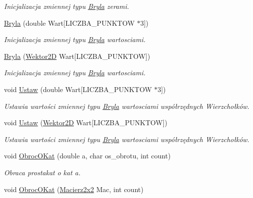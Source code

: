 \begin{DoxyCompactItemize}
\begin{DoxyCompactList}\small\item\em Inicjalizacja zmiennej typu \hyperlink{class_bryla}{Bryla} zerami. \end{DoxyCompactList}\item 
\hyperlink{class_bryla_afb7a04c4b622d9db9119d1a69bc9985b}{Bryla} (double Wart\mbox{[}L\+I\+C\+Z\+B\+A\+\_\+\+P\+U\+N\+K\+T\+O\+W $\ast$3\mbox{]})
\begin{DoxyCompactList}\small\item\em Inicjalizacja zmiennej typu \hyperlink{class_bryla}{Bryla} wartosciami. \end{DoxyCompactList}\item 
\hyperlink{class_bryla_ae2b6090579433d6c3105b757cd77a7df}{Bryla} (\hyperlink{class_wektor2_d}{Wektor2\+D} Wart\mbox{[}L\+I\+C\+Z\+B\+A\+\_\+\+P\+U\+N\+K\+T\+O\+W\mbox{]})
\begin{DoxyCompactList}\small\item\em Inicjalizacja zmiennej typu \hyperlink{class_bryla}{Bryla} wartosciami. \end{DoxyCompactList}\item 
void \hyperlink{class_bryla_a393c921d51e8d970f199c2ae509d8436}{Ustaw} (double Wart\mbox{[}L\+I\+C\+Z\+B\+A\+\_\+\+P\+U\+N\+K\+T\+O\+W $\ast$3\mbox{]})
\begin{DoxyCompactList}\small\item\em Ustawia wartości zmiennej typu \hyperlink{class_bryla}{Bryla} wartosciami współrzędnych Wierzchołków. \end{DoxyCompactList}\item 
void \hyperlink{class_bryla_a8344b8c580b1273097c79a798e80a614}{Ustaw} (\hyperlink{class_wektor2_d}{Wektor2\+D} Wart\mbox{[}L\+I\+C\+Z\+B\+A\+\_\+\+P\+U\+N\+K\+T\+O\+W\mbox{]})
\begin{DoxyCompactList}\small\item\em Ustawia wartości zmiennej typu \hyperlink{class_bryla}{Bryla} wartosciami współrzędnych Wierzchołków. \end{DoxyCompactList}\item 
void \hyperlink{class_bryla_a4b9ee3443c7bfb832b6a57c22c74d93d}{Obroc\+O\+Kat} (double a, char os\+\_\+obrotu, int count)
\begin{DoxyCompactList}\small\item\em Obraca prostakat o kat a. \end{DoxyCompactList}\item 
void \hyperlink{class_bryla_a42cfae8a30be0049756d88fbfc88379a}{Obroc\+O\+Kat} (\hyperlink{class_macierz2x2}{Macierz2x2} Mac, int count)

\end{DoxyCompactItemize}
